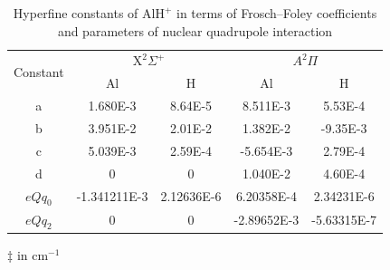 \documentclass[twoside,twocolumn,9pt]{article}
\begin{document}
\begin{table}[htbp!]
\centering
\let\TPToverlap=\TPTrlap
\captionsetup{justification=centering}
\caption{Hyperfine constants of $\mathrm{AlH}^+$ in terms of Frosch--Foley coefficients and parameters of nuclear quadrupole interaction\tnote{$\ddag$}}
\renewcommand{\arraystretch}{1.5}
\begin{threeparttable}
\setlength{\tabcolsep}{6pt}
\begin{tabular}{*{5}{c}}
\hline
\multirow{2}{*}{Constant} &\multicolumn{2}{c}{$\mathrm{X}^2\Sigma^+$} &\multicolumn{2}{c}{$A^2\Pi$} \\
\cline {2-5}
&Al &H  &Al &H\\
 \hline
a               &\num{1.680E-3}           &\num{8.64E-5}            &\num{8.511E-3}              &\num{5.53E-4}         \\
b               &\num{3.951E-2}           &\num{2.01E-2}             &\num{1.382E-2}             &\num{-9.35E-3}         \\
c               &\num{5.039E-3}          &\num{2.59E-4}             &\num{-5.654E-3}            &\num{2.79E-4}         \\
d               &\num{0}                        &\num{0}                         &\num{1.040E-2}             &\num{4.60E-4}          \\
$eQq_0$    &\num{-1.341211E-3}    &\num{2.12636E-6}        &\num{6.20358E-4}       &\num{2.34231E-6}      \\
$eQq_2$    &\num{0}                        &\num{0}                          &\num{-2.89652E-3}    &\num{-5.63315E-7}     \\               
\hline
\end{tabular}
\begin{tablenotes}
\item[$\ddag$] in cm$^{-1}$
\end{tablenotes}
\end{threeparttable}
\label{hyperfineconstant}
\end{table}
\end{document}
